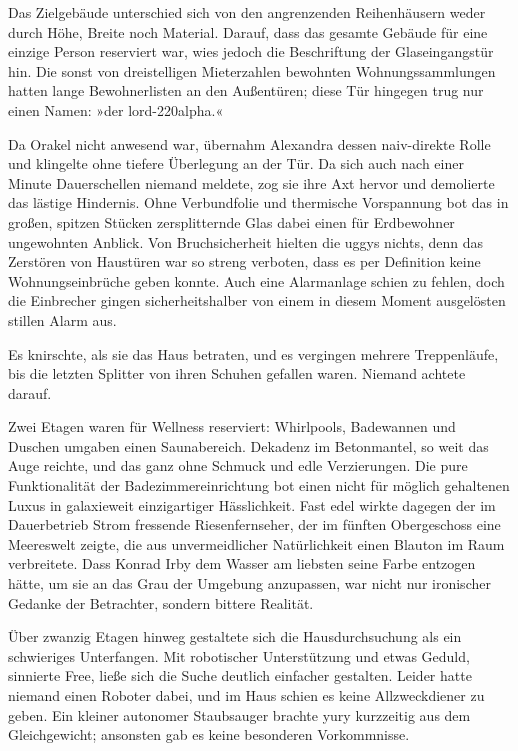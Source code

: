 Das Zielgebäude unterschied sich von den angrenzenden Reihenhäusern weder durch Höhe, Breite noch Material. Darauf, dass das gesamte Gebäude für eine einzige Person reserviert war, wies jedoch die Beschriftung der Glaseingangstür hin. Die sonst von dreistelligen Mieterzahlen bewohnten Wohnungssammlungen hatten lange Bewohnerlisten an den Außentüren; diese Tür hingegen trug nur einen Namen: »der lord-220alpha.«

Da Orakel nicht anwesend war, übernahm Alexandra dessen naiv-direkte Rolle und klingelte ohne tiefere Überlegung an der Tür. Da sich auch nach einer Minute Dauerschellen niemand meldete, zog sie ihre Axt hervor und demolierte das lästige Hindernis. Ohne Verbundfolie und thermische Vorspannung bot das in großen, spitzen Stücken zersplitternde Glas dabei einen für Erdbewohner ungewohnten Anblick. Von Bruchsicherheit hielten die uggys nichts, denn das Zerstören von Haustüren war so streng verboten, dass es per Definition keine Wohnungseinbrüche geben konnte. Auch eine Alarmanlage schien zu fehlen, doch die Einbrecher gingen sicherheitshalber von einem in diesem Moment ausgelösten stillen Alarm aus.

Es knirschte, als sie das Haus betraten, und es vergingen mehrere Treppenläufe, bis die letzten Splitter von ihren Schuhen gefallen waren. Niemand achtete darauf.

Zwei Etagen waren für Wellness reserviert: Whirlpools, Badewannen und Duschen umgaben einen Saunabereich. Dekadenz im Betonmantel, so weit das Auge reichte, und das ganz ohne Schmuck und edle Verzierungen. Die pure Funktionalität der Badezimmereinrichtung bot einen nicht für möglich gehaltenen Luxus in galaxieweit einzigartiger Hässlichkeit. Fast edel wirkte dagegen der im Dauerbetrieb Strom fressende Riesenfernseher, der im fünften Obergeschoss eine Meereswelt zeigte, die aus unvermeidlicher Natürlichkeit einen Blauton im Raum verbreitete. Dass Konrad Irby dem Wasser am liebsten seine Farbe entzogen hätte, um sie an das Grau der Umgebung anzupassen, war nicht nur ironischer Gedanke der Betrachter, sondern bittere Realität.

Über zwanzig Etagen hinweg gestaltete sich die Hausdurchsuchung als ein schwieriges Unterfangen. Mit robotischer Unterstützung und etwas Geduld, sinnierte Free, ließe sich die Suche deutlich einfacher gestalten. Leider hatte niemand einen Roboter dabei, und im Haus schien es keine Allzweckdiener zu geben. Ein kleiner autonomer Staubsauger brachte yury kurzzeitig aus dem Gleichgewicht; ansonsten gab es keine besonderen Vorkommnisse.


